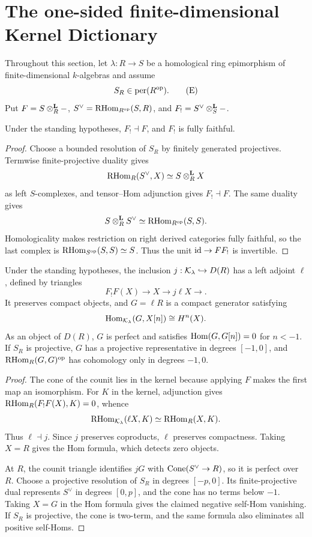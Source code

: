 
\section{The one-sided finite-dimensional Kernel Dictionary}\label{sec:dictionary}

Throughout this section, let \(\lambda:R\to S\) be a homological ring epimorphism of finite-dimensional \(k\)-algebras and assume
\[
 S_R\in\operatorname{per}(R^{\mathrm{op}}).
\tag{E}
\]
Put \(F=S\otimes^{\mathbf L}_R-\), \(S^\vee=\operatorname{RHom}_{R^{\mathrm{op}}}(S,R)\), and \(F_!=S^\vee\otimes^{\mathbf L}_S-\).

\begin{lemma}\label{lem:dual-adjoint}
Under the standing hypotheses, \(F_!\dashv F\), and \(F_!\) is fully faithful.
\end{lemma}

\begin{proof}
Choose a bounded resolution of \(S_R\) by finitely generated projectives.  Termwise finite-projective duality gives
\[
 \operatorname{RHom}_R(S^\vee,X)\simeq S\otimes^{\mathbf L}_RX
\]
as left \(S\)-complexes, and tensor--Hom adjunction gives \(F_!\dashv F\).  The same duality gives
\[
 S\otimes^{\mathbf L}_RS^\vee\simeq\operatorname{RHom}_{R^{\mathrm{op}}}(S,S).
\]
Homologicality makes restriction on right derived categories fully faithful, so the last complex is \(\operatorname{RHom}_{S^{\mathrm{op}}}(S,S)\simeq S\).  Thus the unit \(\operatorname{id}\to FF_!\) is invertible.
\end{proof}

\begin{proposition}\label{prop:left-projection}
Under the standing hypotheses, the inclusion \(j:\mathcal K_\lambda\hookrightarrow D(R)\) has a left adjoint \(\ell\), defined by triangles
\[
 F_!F(X)\longrightarrow X\longrightarrow j\ell X\longrightarrow.
\]
It preserves compact objects, and \(G=\ell R\) is a compact generator satisfying
\[
 \operatorname{Hom}_{\mathcal K_\lambda}(G,X[n])\cong H^n(X).
\]
As an object of \(D(R)\), \(G\) is perfect and satisfies \(\operatorname{Hom}(G,G[n])=0\) for \(n<-1\).  If \(S_R\) is projective, \(G\) has a projective representative in degrees \([-1,0]\), and \(\operatorname{RHom}_R(G,G)^{\mathrm{op}}\) has cohomology only in degrees \(-1,0\).
\end{proposition}

\begin{proof}
The cone of the counit lies in the kernel because applying \(F\) makes the first map an isomorphism.  For \(K\) in the kernel, adjunction gives \(\operatorname{RHom}_R(F_!F(X),K)=0\), whence
\[
 \operatorname{RHom}_{\mathcal K_\lambda}(\ell X,K)\simeq\operatorname{RHom}_R(X,K).
\]
Thus \(\ell\dashv j\).  Since \(j\) preserves coproducts, \(\ell\) preserves compactness.  Taking \(X=R\) gives the Hom formula, which detects zero objects.

At \(R\), the counit triangle identifies \(jG\) with \(\operatorname{Cone}(S^\vee\to R)\), so it is perfect over \(R\).  Choose a projective resolution of \(S_R\) in degrees \([-p,0]\).  Its finite-projective dual represents \(S^\vee\) in degrees \([0,p]\), and the cone has no terms below \(-1\).  Taking \(X=G\) in the Hom formula gives the claimed negative self-Hom vanishing.  If \(S_R\) is projective, the cone is two-term, and the same formula also eliminates all positive self-Homs.
\end{proof}


